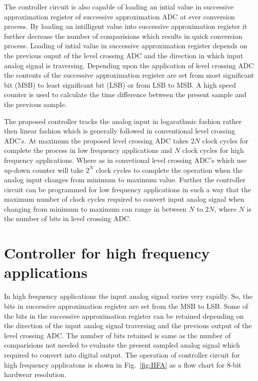 \par
\hspace{0.6cm} The controller circuit is also capable of loading an intial value in successive approximation register of successive approximation ADC at ever conversion process. By loading an intilligent value into successive approximation register it further decrease the number of comparisions which results in quick conversion process. Loading of intial value in successive approximation register depends on the previous ouput of the level crossing ADC and the direction in which input analog signal is traversing. Depending upon the application of level crossing ADC the contents of the successive approximation register are set from most significant bit (MSB) to least significant bit (LSB) or from LSB to MSB. A high speed counter is used to calculate the time difference between the present sample and the previous sample.

\par
\hspace{0.6cm} The proposed controller tracks the analog input in logarathmic fashion rather then linear fashion which is generally followed in conventional level crossing ADC's. At maximum the proposed level crossing ADC takes $2N$ clock cycles for complete the process in low frequency applications and $N$ clock cycles for high frequency applications. Where as in convetional  level crossing ADC's which use up-down counter will take $2^N$ clock cycles to complete the operation when the analog input changes from minimum to maximum value. Further the controller circuit can be programmed for low frequency applications in such a way that the maximum number of clock cycles required to convert input analog signal when changing from minimum to maximum can range in between $N$ to $2N$, where $N$ is the number of bits in level crossing ADC.\par


\section{Controller for high frequency applications}

\par
\hspace{1.2cm} In high frequency applications the input analog signal varies very rapidly. So, the bits in successive approximation register are set from the MSB to LSB. Some of the bits in the successive approximation register can be retained depending on the direction of the input analog signal traversing and the previous output of the level crossing ADC. The number of bits retained is same as the number of comparisions not needed to evaluate the present sampled analog signal which required to convert into digital output. The operation of controller circuit for high frequency applicatons is shown in Fig.~\ref{fig:HFA} as a flow chart for 8-bit hardwear resolution. \par


